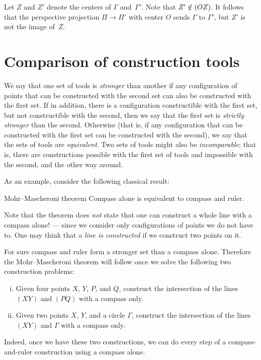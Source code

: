 Let $Z$ and $Z'$ denote the centers of $\Gamma$ and~$\Gamma'$.
Note that  $Z'\notin(OZ)$.
It follows that the perspective projection $\Pi\to \Pi'$ with center $O$ sends $\Gamma$ to $\Gamma'$, but $Z'$ is not the image of~$Z$.
\qeds

\section{Comparison of construction tools}

We say that one set of tools is {}\emph{stronger} than another if any configuration of points that can be constructed with the second set can also be constructed with the first set.
If in addition, there is a configuration constructible with the first set, but not constructible with the second, then we say that the first set is {}\emph{strictly stronger} than the second.
Otherwise (that is, if any configuration that can be constructed with the first set can be constructed with the second), we say that the sets of tools are {}\emph{equivalent}. 
Two sets of tools might also be {}\emph{incomparable};
that is, there are constructions possible with the first set of tools and impossible with the second, and the other way around.

As an example, consider the following classical result:

\begin{thm}{Mohr--Mascheroni theorem}
Compass alone is equivalent to compass and ruler.
\end{thm}

Note that the theorem does \textit{not} state that one can construct a whole line with a compass alone!
--- since we consider only configurations of points we do not have to.
One may think that a \textit{line is constructed} if we construct two points on it.

For sure compass and ruler form a stronger set than a compass alone.
Therefore the Mohr--Mascheroni theorem will follow once we solve the following two construction problems:
\begin{enumerate}[(i)]
\item Given four points $X$, $Y$, $P$, and $Q$, construct the intersection of the lines $(XY)$ and $(PQ)$ with  a compass only.
\item Given two points $X$, $Y$, and a circle $\Gamma$, construct the intersection of the lines $(XY)$ and $\Gamma$ with a compass only.
\end{enumerate}
Indeed, once we have these two constructions, we can do every step of a compass-and-ruler construction using a compass alone.

